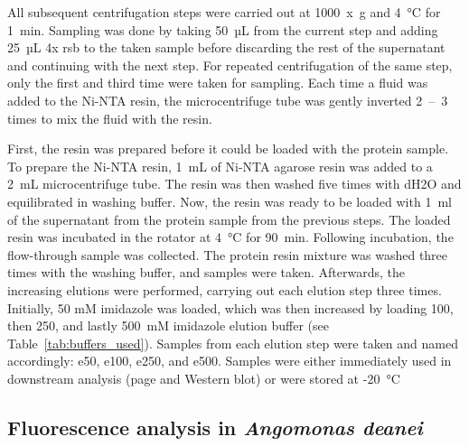 \par All subsequent centrifugation steps were carried out at 1000~x~g and 4~°C for 1~min. Sampling was done by taking 50~µL from the current step and adding 25~µL 4x \gls{rsb} to the taken sample before discarding the rest of the supernatant and continuing with the next step. For repeated centrifugation of the same step, only the first and third time were taken for sampling. Each time a fluid was added to the \gls{Ni-NTA} resin, the microcentrifuge tube was gently inverted 2~--~3 times to mix the fluid with the resin. 

\par First, the resin was prepared before it could be loaded with the protein sample. To prepare the \gls{Ni-NTA} resin, 1~mL of \gls{Ni-NTA} agarose resin was added to a 2~mL microcentrifuge tube. The resin was then washed five times with \gls{dH2O} and equilibrated in washing buffer. Now, the resin was ready to be loaded with 1~ml of the supernatant from the protein sample from the previous steps. The loaded resin was incubated in the rotator at 4~°C for 90~min. Following incubation, the flow-through sample was collected. The protein resin mixture was washed three times with the washing buffer, and samples were taken. Afterwards, the increasing elutions were performed, carrying out each elution step three times. Initially, 50 mM imidazole was loaded, which was then increased by loading 100, then 250, and lastly 500~mM imidazole elution buffer (see Table~\ref{tab:buffers_used}). Samples from each elution step were taken and named accordingly: e50, e100, e250, and e500. Samples were either immediately used in downstream analysis (\gls{page} and Western blot) or were stored at -20~°C 

\subsection{Fluorescence analysis in \textit{Angomonas deanei}} 
